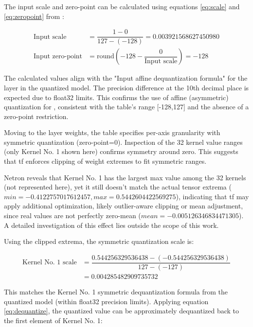 {The input scale and zero-point can be calculated using equations \ref{eq:scale} and \ref{eq:zeropoint} from :

\[
\begin{array}{rl}
\text{Input scale} &= \dfrac{1 - 0}{127 - (-128)} = 0.003921568627450980 \\[16pt]
\text{Input zero-point} &= \text{round}\!\left(-128 - \dfrac{0}{\text{Input scale}}\right) = -128
\end{array}
\]

The calculated values align with the "Input affine dequantization formula" for the  layer in the quantized model.
The precision difference at the 10th decimal place is expected due to \gls{float32} limits.
This confirms the use of affine (asymmetric) quantization for ,
consistent with the table's range [-128,127] and the absence of a zero-point restriction.

Moving to the  layer weights, the table specifies per-axis granularity with symmetric quantization (zero-point=0).
Inspection of the 32 kernel value ranges (only Kernel No. 1 shown here) confirms symmetry around zero.
This suggests that \gls{tf} enforces clipping of weight extremes to fit symmetric ranges.

Netron reveals that Kernel No. 1 has the largest max value among the 32 kernels (not represented here),
yet it still doesn't match the actual tensor extrema ($min=-0.4122757017612457, max=0.5442604422569275$),
indicating that \gls{tf} may apply additional optimization, likely outlier-aware clipping or mean adjustment,
since real values are not perfectly zero-mean ($mean=-0.005126346834471305$).
A detailed investigation of this effect lies outside the scope of this work.

Using the clipped extrema, the symmetric quantization scale is:

\[
\begin{array}{rl}
\text{Kernel No. 1 scale} &= \dfrac{0.544256329536438 - (-0.544256329536438)}{127 - (-127)}\\[8pt]
                          &= 0.004285482909735732
\end{array}
\]

This matches the Kernel No. 1 symmetric dequantization formula from the quantized model (within \gls{float32} precision limits).
Applying equation \ref{eq:dequantize}, the quantized value can be approximately dequantized back to the first element of Kernel No. 1:

}
